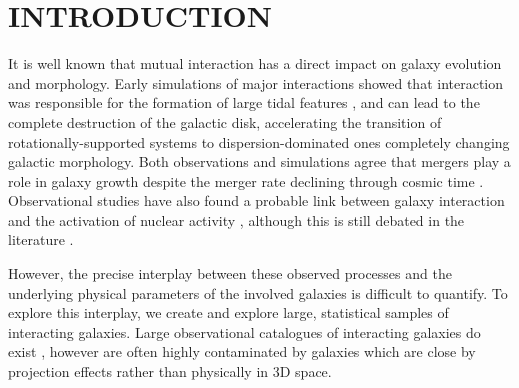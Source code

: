 \section{INTRODUCTION}\label{Introduction}
\noindent It is well known that mutual interaction has a direct impact on galaxy evolution and morphology. Early simulations of major interactions showed that interaction was responsible for the formation of large tidal features \citep[e.g][]{1972ApJ...178..623T, 1978MNRAS.184..185W, 1990AJ....100.1477W, 1990ApJ...356..359H, 2005A&A...437...69B,2008MNRAS.391.1137L, 2012ApJ...747...85X, 2023PASJ...75..986T}, and can lead to the complete destruction of the galactic disk, accelerating the transition of rotationally-supported systems to dispersion-dominated ones \citep{1972ApJ...178..623T, 2009ApJ...691.1168H,2022ApJ...925..168Y} completely changing galactic morphology. Both observations and simulations agree that mergers play a role in galaxy growth \citep{2015MNRAS.452.2845K, 2017MNRAS.472L..50M, 2020MNRAS.494.4969P} despite the merger rate declining through cosmic time \citep{2010MNRAS.406.2267F, 2011ApJ...742..103L, 2013A&A...553A..78L, 2015MNRAS.449...49R, 2022MNRAS.516.4922R}. Observational studies have also found a probable link between galaxy interaction and the activation of nuclear activity \citep{2008AJ....135.1877E, 2020ApJ...904...79M, 2023MNRAS.519.4966B}, although this is still debated in the literature \citep{2007ApJ...660L..19P, 2014MNRAS.439.3342V, 2022ApJ...925..157Z}.

 However, the precise interplay between these observed processes and the underlying physical parameters of the involved galaxies is difficult to quantify. To explore this interplay, we create and explore large, statistical samples of interacting galaxies. Large observational catalogues of interacting galaxies do exist \citep[e.g][]{2010MNRAS.401.1043D, 2022A&A...661A..52P, 2023ApJ...948...40O}, however are often highly contaminated by galaxies which are close by projection effects rather than physically in 3D space. 
 
